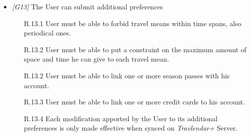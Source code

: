 \begin{itemize}
	\item \textit{[G13]} The User can submit additional preferences
		\begin{itemize}
			\item[R.13.1] User must be able to forbid travel means within time spans, also periodical ones.
			\item[R.13.2] User must be able to put a constraint on the maximum amount of space and time he can give to each travel mean.
			\item[R.13.2] User must be able to link one or more season passes with his account.
			\item[R.13.3] User must be able to link one or more credit cards to his account.
			\item[R.13.4] Each modification apported by the User to its additional preferences is only made effective when synced on \textit{Travlendar+} Server.
		\end{itemize}
		
\end{itemize}
            
\vfill
